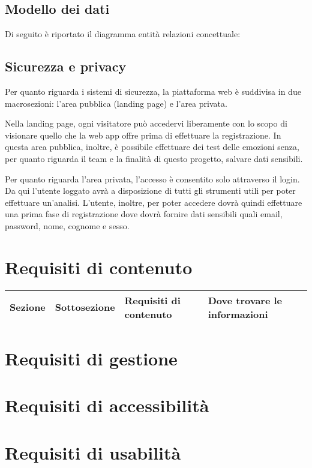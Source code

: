\subsection{Modello dei dati}
Di seguito è riportato il diagramma entità relazioni concettuale:


\subsection{Sicurezza e privacy}
Per quanto riguarda i sistemi di sicurezza, la piattaforma web è suddivisa in 
due macrosezioni: l'area pubblica (landing page) e l'area privata.

Nella landing page, ogni visitatore può accedervi liberamente con lo scopo di 
visionare quello che la web app offre prima di effettuare la registrazione. In 
questa area pubblica, inoltre, è possibile effettuare dei test delle emozioni 
senza, per quanto riguarda il team e la finalità di questo progetto, salvare 
dati sensibili.

Per quanto riguarda l'area privata, l'accesso è consentito solo attraverso il 
login. Da qui l'utente loggato avrà a disposizione di tutti gli strumenti utili 
per poter effettuare un'analisi. L'utente, inoltre, per poter accedere dovrà 
quindi effettuare una prima fase di registrazione dove dovrà fornire dati 
sensibili quali email, password, nome, cognome e sesso.

\section{Requisiti di contenuto}\label{sec:requisiti-di-contenuto}

\begin{table}[H]
	\centering
	\caption{I bisogni degli utenti di Emotionally.}
	\label{tab:bisogni-utenti}
	\begin{longtable}{@{}|>{\centering\arraybackslash}m{}|m{}|m{}|>{\centering\arraybackslash}m{}|@{}}
		\hline
		\rowcolor{emotionally-color}
		{\color{white} \textbf{Sezione}}   & {\color{white} 
		\textbf{Sottosezione}}     & {\color{white} \textbf{Requisiti di 
		contenuto}} & {\color{white} \textbf{Dove trovare le informazioni}} 
		\\\hline
		\endfirsthead
		\hline
	\end{longtable}
\end{table}
\section{Requisiti di gestione}\label{sec:requisiti-di-gestione}

\section{Requisiti di accessibilità}\label{sec:requisiti-di-accessibilita}

\section{Requisiti di usabilità}\label{sec:requisiti-di-usabilita}
